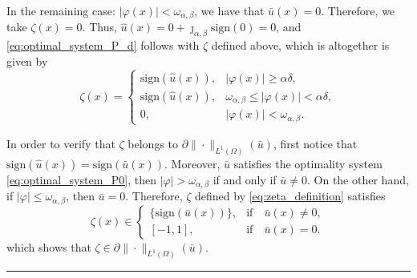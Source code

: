 \documentclass[11pt,a4paper]{amsart}
\newcommand{\kw}{\rule{2mm}{2mm}}
\newcommand{\om}{\Omega}
\newcommand{\sign}{\mathrm{sign}}
\renewenvironment{proof}{{Proof.}}{\hfill\kw}
\begin{document}
\begin{proof}


In the remaining case: $|\varphi(x)|<\omega_{\alpha,\beta}$, we have that $\bar u(x)=0$. Therefore, we take $\zeta(x)=0$.  Thus, $\hat u(x)=0+\jmath_{\alpha, \beta}\sign(0)=0$, and  \eqref{eq:optimal_system_P_d} follows with $\zeta$ defined above, which is altogether is given by 
\begin{equation}\label{eq:zeta_definition}
\zeta(x)=
\begin{cases} 
\sign(\hat u(x)), &|\varphi(x)|\ge \alpha \delta,\\
\sign(\hat u(x)),&\omega_{\alpha,\beta}\le |\varphi(x)|<\alpha\delta,\\
0, &|\varphi(x)|<\omega_{\alpha,\beta}.
\end{cases}
\end{equation}


In order to verify that $\zeta$ belongs to $\partial\|\cdot\|_{L^1(\om)}(\bar u)$, first notice that $\sign(\hat u(x))=\sign(\bar u(x))$. Moreover, $\bar u$ satisfies the optimality system \eqref{eq:optimal_system_P0}, then $|\varphi|> \omega_{\alpha,\beta} $ if and only if $\bar u \not =0$. On the other hand, if  $|\varphi| \leq \omega_{\alpha,\beta} $, then $\bar u = 0$. Therefore, $\zeta$ defined by \eqref{eq:zeta_definition} satisfies
$$
\zeta(x) \in
\begin{cases} 
\{\sign(\bar u(x))\}, & \text{if}\quad \bar u(x) \neq 0,\\
[-1,1], & \text{if}\quad\bar u(x) = 0.
\end{cases}
$$
which shows that $\zeta \in \partial\|\cdot\|_{L^1(\om)}(\bar u)$.
\end{proof}
\end{document}
